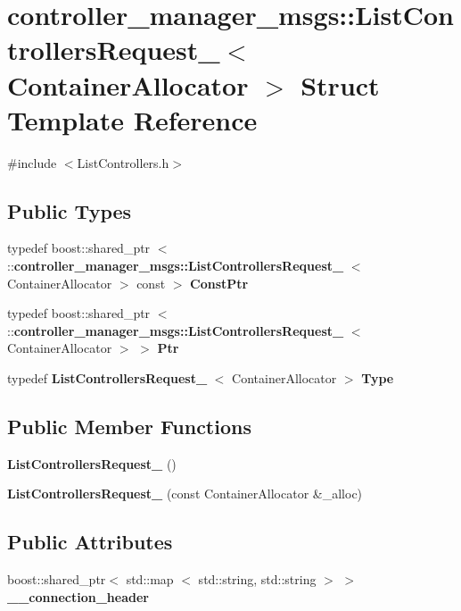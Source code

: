 \section{controller\-\_\-manager\-\_\-msgs\-:\-:\-List\-Controllers\-Request\-\_\-$<$ \-Container\-Allocator $>$ \-Struct \-Template \-Reference}
\label{structcontroller__manager__msgs_1_1ListControllersRequest__}


{\ttfamily \#include $<$\-List\-Controllers.\-h$>$}

\subsection*{\-Public \-Types}
\begin{DoxyCompactItemize}
\item 
typedef boost\-::shared\-\_\-ptr\*
$<$ \-::{\bf controller\-\_\-manager\-\_\-msgs\-::\-List\-Controllers\-Request\-\_\-}\*
$<$ \-Container\-Allocator $>$ const  $>$ {\bf \-Const\-Ptr}
\item 
typedef boost\-::shared\-\_\-ptr\*
$<$ \-::{\bf controller\-\_\-manager\-\_\-msgs\-::\-List\-Controllers\-Request\-\_\-}\*
$<$ \-Container\-Allocator $>$ $>$ {\bf \-Ptr}
\item 
typedef \*
{\bf \-List\-Controllers\-Request\-\_\-}\*
$<$ \-Container\-Allocator $>$ {\bf \-Type}
\end{DoxyCompactItemize}
\subsection*{\-Public \-Member \-Functions}
\begin{DoxyCompactItemize}
\item 
{\bf \-List\-Controllers\-Request\-\_\-} ()
\item 
{\bf \-List\-Controllers\-Request\-\_\-} (const \-Container\-Allocator \&\-\_\-alloc)
\end{DoxyCompactItemize}
\subsection*{\-Public \-Attributes}
\begin{DoxyCompactItemize}
\item 
boost\-::shared\-\_\-ptr$<$ std\-::map\*
$<$ std\-::string, std\-::string $>$ $>$ {\bf \-\_\-\-\_\-connection\-\_\-header}
\end{DoxyCompactItemize}


